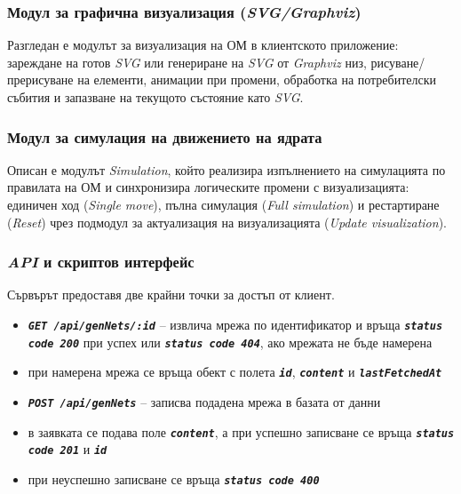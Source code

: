 \subsubsection{Модул за графична визуализация (\textit{SVG/Graphviz})}
\hspace*{2.5em}Разгледан е модулът за визуализация на ОМ в клиентското приложение: зареждане на готов \textit{SVG} или генериране на \textit{SVG} от \textit{Graphviz} низ, рисуване/прерисуване на елементи, анимации при промени, обработка на потребителски събития и запазване на текущото състояние като \textit{SVG}.

\subsubsection{Модул за симулация на движението на ядрата}
\hspace*{2.5em}Описан е модулът \textit{Simulation}, който реализира изпълнението на симулацията по правилата на ОМ и синхронизира логическите промени с визуализацията: единичен ход (\textit{Single move}), пълна симулация (\textit{Full simulation}) и рестартиране (\textit{Reset}) чрез подмодул за актуализация на визуализацията (\textit{Update visualization}).

\subsubsection{\textit{API} и скриптов интерфейс}\label{sec:api-script-interface}

Сървърът предоставя две крайни точки за достъп от клиент.

\vspace{-10pt}
\begin{itemize}
	\item \texttt{\textbf{\textit{GET /api/genNets/:id}}} -- извлича мрежа по идентификатор и връща \texttt{\textbf{\textit{status code 200}}} при успех или \texttt{\textbf{\textit{status code 404}}}, ако мрежата не бъде намерена
	\item при намерена мрежа се връща обект с полета \texttt{\textbf{\textit{id}}}, \texttt{\textbf{\textit{content}}} и \texttt{\textbf{\textit{lastFetchedAt}}}
	\item \texttt{\textbf{\textit{POST /api/genNets}}} -- записва подадена мрежа в базата от данни
	\item в заявката се подава поле \texttt{\textbf{\textit{content}}}, а при успешно записване се връща \texttt{\textbf{\textit{status code 201}}} и \texttt{\textbf{\textit{id}}}
	\item при неуспешно записване се връща \texttt{\textbf{\textit{status code 400}}}
\end{itemize}

